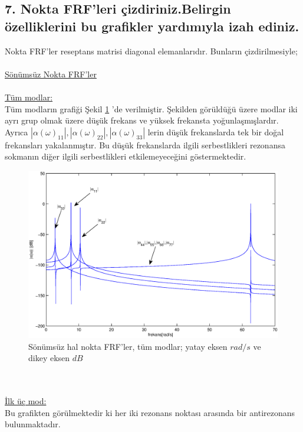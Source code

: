 \documentclass[a4paper]{report}
\begin{document}
\subsection*{7. Nokta FRF'leri çizdiriniz.Belirgin özelliklerini bu grafikler yardımıyla izah ediniz.}
Nokta FRF'ler reseptans matrisi diagonal elemanlarıdır. Bunların çizdirilmesiyle;\\
~\\
\underline{Sönümsüz Nokta FRF'ler}\\
~\\
\underline{Tüm modlar:}\\
Tüm modların grafiği Şekil \ref{fig:noktaFRF} 'de verilmiştir. Şekilden görüldüğü üzere modlar iki ayrı grup olmak üzere düşük frekans ve yüksek frekansta yoğunlaşmışlardır. Ayrıca $|\alpha(\omega)_{11}|,|\alpha(\omega)_{22}|,|\alpha(\omega)_{33}|$ lerin düşük frekanslarda tek bir doğal frekansları yakalanmıştır. Bu düşük frekanslarda ilgili serbestlikleri rezonansa sokmanın diğer ilgili serbestlikleri etkilemeyeceğini göstermektedir.
\begin{figure}[H]
\shorthandoff{=}
\centerline{
{\includegraphics[width=1.3\textwidth]{./noktaFRF.eps}}}
\caption[Sönümsüz hal nokta FRF'ler]{Sönümsüz hal nokta FRF'ler, tüm modlar; yatay eksen ${rad}/{s}$ ve dikey eksen $dB$ }
\label{fig:noktaFRF}
\end{figure}
~\\
\clearpage~\\
\underline{İlk üç mod:}\\
Bu grafikten görülmektedir ki her iki rezonans noktası arasında bir antirezonans bulunmaktadır.
\end{document}
